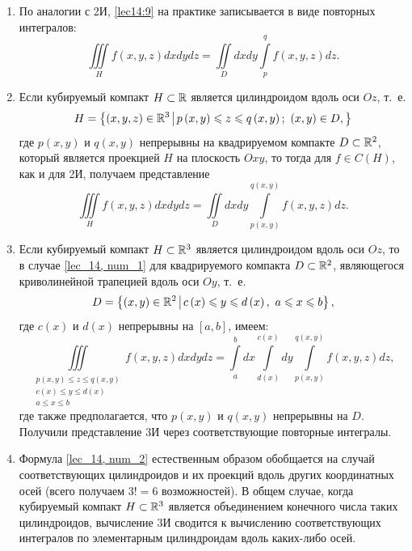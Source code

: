 \documentclass[../../main.tex]{subfiles}
\begin{document}
	\begin{rems}
		\quad
		\begin{enumerate}
			\item По аналогии с 2И, \eqref{lec14:9} на практике записывается в виде 
			повторных 
			интегралов:
			\begin{equation}
			\iiint\limits_{H} f \left( x, y, z \right) dx dy dz = \iint\limits_{D} 
			dx dy \int\limits_{p}^{q} f\left(x, y, 
			z\right) dz. \label{lec_14, num_1}
			\end{equation}
			
			\item Если кубируемый компакт $H \subset \mathbb{R}$ является цилиндроидом вдоль 
			оси $Oz$, 
			т.~е. 
			\[H = \left\{\left(x, y, z \right) \in \R^3 \; \vline \; p \left(x, 
			y\right) \leq z \leq q \left(x, y \right);\  \left(x, y\right) \in D,
			\right\} \]
			где $p\left(x, y\right)$ и $q\left(x, y\right)$ непрерывны на квадрируемом 
			компакте $D \subset \mathbb{R}^2$, который является проекцией $H$ на плоскость 
			$Oxy$, то тогда для $f 
			\in C\left(H\right)$, как и для 2И, получаем представление
			\[\iiint\limits_{H} f \left( x, y, z \right) dx dy dz = \iint\limits_{D} 
			dx dy \int\limits_{p\left(x, y\right)}^{q\left(x, y \right)} f\left(x, y, 
			z\right) dz.\]
			
			\item Если кубируемый компакт $H \subset \mathbb{R}^3$ является цилиндроидом вдоль 
			оси 
			$Oz$, то в случае \eqref{lec_14, num_1} для квадрируемого компакта $D 
			\subset \mathbb{R}^2$, являющегося криволинейной трапецией вдоль оси $Oy$, т.~е.
			\[D = \left\{\left(x, y\right) \in \R^2 \; \vline \; c \left(x\right) \leq 
			y \leq d \left(x \right),\ a \leq x \leq b \right\}, \]
			где $c(x)$ и $d(x)$ непрерывны на $\left[a, b\right]$, имеем:
			\begin{equation}
			\iiint\limits_{\substack{
				p\left(x, y\right) \leq z \leq q\left(x, y\right)\\
				c\left(x\right) \leq y \leq d\left(x\right)\\
				a \leq x \leq b
				}} f \left( x, y, z \right) dx dy dz = \int\limits_{a}^{b} dx 
				\int\limits_{d\left(x\right)}^{c\left(x\right)} dy \int\limits_{p\left(x, 
				y\right)}^{q\left(x, y\right)} f(x, y, z) dz, \label{lec_14, num_2}
			\end{equation}
			где также предполагается, что $p\left(x, y\right)$ и $q\left(x, y\right)$ 
			непрерывны на $D$.
			Получили представление 3И через соответствующие повторные интегралы.
			
			\item Формула \eqref{lec_14, num_2} естественным образом обобщается на 
			случай соответствующих цилиндроидов и их проекций вдоль других координатных 
			осей (всего получаем $3! = 6$ возможностей). В общем случае, когда 
			кубируемый компакт $H \subset \mathbb{R}^3$ является объединением конечного числа 
			таких цилиндроидов, вычисление 3И сводится к вычислению соответствующих 
			интегралов по элементарным цилиндроидам вдоль каких-либо осей. 
		\end{enumerate}
	\end{rems}
\end{document}
